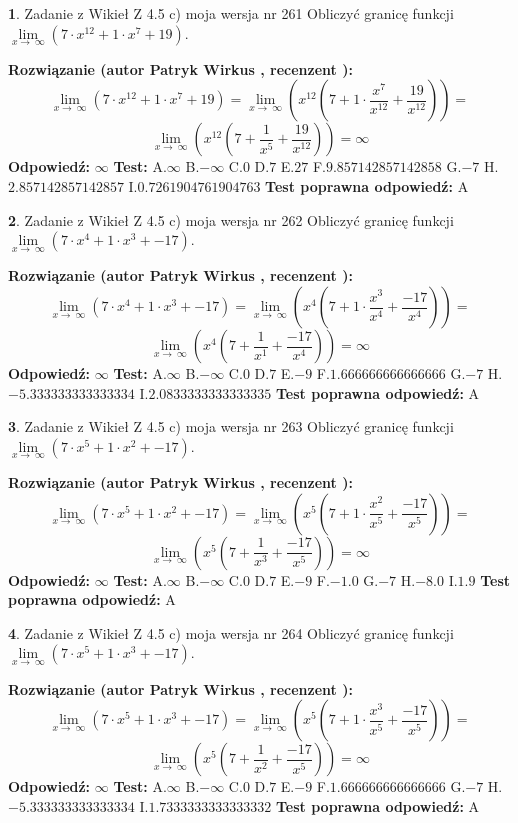 \documentclass[12pt, a4paper]{article}
\theoremstyle{definition} %
\newtheorem{zad}{}
\newcommand{\zadStart}[1]{\begin{zad}#1\newline}
\newcommand{\zadStop}{\end{zad}}
\newcommand{\rozwStart}[2]{\noindent \textbf{Rozwiązanie (autor #1 , recenzent #2): }\newline}
\newcommand{\rozwStop}{\newline}
\newcommand{\odpStart}{\noindent \textbf{Odpowiedź:}\newline}
\newcommand{\odpStop}{\newline}
\newcommand{\testStart}{\noindent \textbf{Test:}\newline}
\newcommand{\testStop}{\newline}
\newcommand{\kluczStart}{\noindent \textbf{Test poprawna odpowiedź:}\newline}
\newcommand{\kluczStop}{\newline}
\begin{document}
\zadStart{Zadanie z Wikieł Z 4.5 c) moja wersja nr 261}
Obliczyć granicę funkcji  $\lim\limits_{x\to\ \infty}(7 \cdot x^{12}+1 \cdot x^{7}+19)$.
\zadStop
\rozwStart{Patryk Wirkus}{}
$$\lim\limits_{x\to\ \infty}(7 \cdot x^{12}+1 \cdot x^{7}+19) = \lim\limits_{x\to\ \infty}(x^{12}(7 +1 \cdot \frac{x^{7}}{x^{12}}+\frac{19}{x^{12}})) =$$ $$\lim\limits_{x\to\ \infty}(x^{12}(7 +\frac{1}{x^{5}}+\frac{19}{x^{12}})) =\infty$$
\rozwStop
\odpStart
$\infty$
\odpStop
\testStart
A.$\infty$ B.$-\infty$ C.$0$ D.$7$ E.$27$
F.$9.857142857142858$ G.$-7$
H.$2.857142857142857$
I.$0.7261904761904763$
\testStop
\kluczStart
A
\kluczStop



\zadStart{Zadanie z Wikieł Z 4.5 c) moja wersja nr 262}
Obliczyć granicę funkcji  $\lim\limits_{x\to\ \infty}(7 \cdot x^{4}+1 \cdot x^{3}+-17)$.
\zadStop
\rozwStart{Patryk Wirkus}{}
$$\lim\limits_{x\to\ \infty}(7 \cdot x^{4}+1 \cdot x^{3}+-17) = \lim\limits_{x\to\ \infty}(x^{4}(7 +1 \cdot \frac{x^{3}}{x^{4}}+\frac{-17}{x^{4}})) =$$ $$\lim\limits_{x\to\ \infty}(x^{4}(7 +\frac{1}{x^{1}}+\frac{-17}{x^{4}})) =\infty$$
\rozwStop
\odpStart
$\infty$
\odpStop
\testStart
A.$\infty$ B.$-\infty$ C.$0$ D.$7$ E.$-9$
F.$1.666666666666666$ G.$-7$
H.$-5.333333333333334$
I.$2.0833333333333335$
\testStop
\kluczStart
A
\kluczStop



\zadStart{Zadanie z Wikieł Z 4.5 c) moja wersja nr 263}
Obliczyć granicę funkcji  $\lim\limits_{x\to\ \infty}(7 \cdot x^{5}+1 \cdot x^{2}+-17)$.
\zadStop
\rozwStart{Patryk Wirkus}{}
$$\lim\limits_{x\to\ \infty}(7 \cdot x^{5}+1 \cdot x^{2}+-17) = \lim\limits_{x\to\ \infty}(x^{5}(7 +1 \cdot \frac{x^{2}}{x^{5}}+\frac{-17}{x^{5}})) =$$ $$\lim\limits_{x\to\ \infty}(x^{5}(7 +\frac{1}{x^{3}}+\frac{-17}{x^{5}})) =\infty$$
\rozwStop
\odpStart
$\infty$
\odpStop
\testStart
A.$\infty$ B.$-\infty$ C.$0$ D.$7$ E.$-9$
F.$-1.0$ G.$-7$
H.$-8.0$
I.$1.9$
\testStop
\kluczStart
A
\kluczStop



\zadStart{Zadanie z Wikieł Z 4.5 c) moja wersja nr 264}
Obliczyć granicę funkcji  $\lim\limits_{x\to\ \infty}(7 \cdot x^{5}+1 \cdot x^{3}+-17)$.
\zadStop
\rozwStart{Patryk Wirkus}{}
$$\lim\limits_{x\to\ \infty}(7 \cdot x^{5}+1 \cdot x^{3}+-17) = \lim\limits_{x\to\ \infty}(x^{5}(7 +1 \cdot \frac{x^{3}}{x^{5}}+\frac{-17}{x^{5}})) =$$ $$\lim\limits_{x\to\ \infty}(x^{5}(7 +\frac{1}{x^{2}}+\frac{-17}{x^{5}})) =\infty$$
\rozwStop
\odpStart
$\infty$
\odpStop
\testStart
A.$\infty$ B.$-\infty$ C.$0$ D.$7$ E.$-9$
F.$1.666666666666666$ G.$-7$
H.$-5.333333333333334$
I.$1.7333333333333332$
\testStop
\kluczStart
A
\kluczStop
\end{document}
